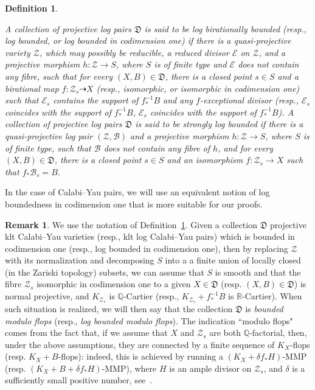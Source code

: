\documentclass[11pt]{ip-journal}
\newtheorem{definition}[theorem]{Definition}
\theoremstyle{definition}
\newtheorem{remark}[theorem]{Remark}
\newcommand{\bQ}{\mathbb{Q}}
\newcommand{\bR}{\mathbb{R}}
\begin{document}
\begin{definition}
\label{def.bound.pairs}

A collection of projective log pairs 
$\mathfrak{D}$ 
is said to be \emph{log birationally bounded} (resp.,  \emph{log bounded}, or \emph{log bounded in codimension one}) if there is a quasi-projective variety 
$\mathcal{Z}$, 
which may possibly be reducible, a reduced divisor 
$\mathcal{E}$ 
on 
$\mathcal Z$, 
and a projective morphism 
$h\colon \mathcal{Z}\to S$, 
where
$S$ 
is of finite type and 
$\mathcal{E}$ 
does not contain any fibre, such that for every 
$(X,B)\in \mathfrak{D}$, 
there is a closed point 
$s \in S$ 
and a birational map 
$f \colon \mathcal{Z}_s \dashrightarrow X$ 
(resp., isomorphic, or isomorphic in codimension one) such that 
$\mathcal{E}_s$ 
contains the support of 
$f_*^{-1}B$ 
and any 
$f$-exceptional 
divisor (resp., 
$\mathcal{E}_s$ 
coincides with the support of 
$f_*^{-1}B$, $\mathcal{E}_s$ 
coincides with the support of 
$f_*^{-1}B$).
\newline
A collection of projective log pairs 
$\mathfrak{D}$ 
is said to be \emph{strongly log bounded} if there is a quasi-projective log pair 
$(\mathcal{Z}, \mathcal B)$ 
and a projective morphism 
$h\colon \mathcal{Z}\to S$, 
where 
$S$ 
is of finite type, such that 
$\mathcal{B}$ 
does not contain any fibre of 
$h$, 
and for every 
$(X,B)\in \mathfrak{D}$, 
there is a closed point 
$s \in S$ 
and an isomorphism 
$f \colon \mathcal{Z}_s \to X$ 
such that 
$f_\ast \mathcal{B}_s= B$.
\end{definition}

In the case of Calabi--Yau pairs, we will use an equivalent notion of log boundedness in codimension one that is more suitable for our proofs.

\begin{remark}
\label{def:bound.mod.flops}
We use the notation of Definition~\ref{def.bound.pairs}.
Given a collection 
$\mathfrak{D}$ 
projective klt Calabi--Yau varieties 
(resp., klt log Calabi--Yau pairs) 
which is bounded in codimension one 
(resp., log bounded in codimension one), 
then by replacing 
$\mathcal Z$ 
with its normalization and decomposing 
$S$
into a a finite union of locally closed 
(in the Zariski topology) 
subsets, we can assume that 
$S$
is smooth and that the fibre 
$\mathcal{Z}_{s}$ 
isomorphic in codimension one to a given
$X \in \mathfrak D$
(resp.
$(X, B) \in \mathfrak D$) 
is normal projective, and 
$K_{\mathcal{Z}_s}$ 
is 
$\bQ$-Cartier 
(resp., 
$K_{\mathcal{Z}_s}+f_*^{-1}B$ 
is 
$\bR$-Cartier). 
When such situation is realized, we will then say that the collection
$\mathfrak D$
is {\it bounded modulo flops} 
(resp., {\it log bounded modulo flops}). 
The indication ``modulo flops" comes from the fact that, if we assume that 
$X$ 
and 
$\mathcal{Z}_s$ 
are both 
$\bQ$-factorial, 
then, under the above assumptions, they are connected by a finite sequence of 
$K_X$-flops 
(resp. 
$K_X+B$-flops): 
indeed, this is achieved by running a 
$(K_X+\delta f_\ast H)$-MMP
(resp. 
$(K_X+B+\delta f_\ast H)$-MMP), 
where 
$H$ 
is an ample divisor on 
$\mathcal{Z}_s$, 
and 
$\delta$ 
is a sufficiently small positive number, 
see~\cites{BCHM, MR2426353}.
\end{remark}
\end{document}
